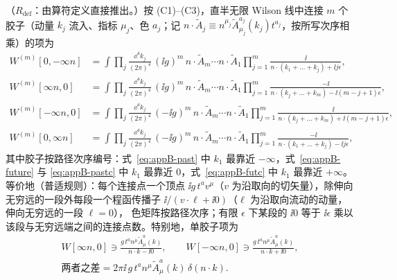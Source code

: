 \begin{proposition}\label{prop:appB-rules}
（$R_{\mathrm{def}}$：由算符定义直接推出。）按 (C1)--(C3)，直半无限 Wilson 线中连接 $m$ 个胶子（动量 $k_j$ 流入、指标 $\mu_j$、色 $a_j$；记 $n\cdot\tilde A_j\equiv n^{\mu_j}\tilde A^{a_j}_{\mu_j}(k_j)t^{a_j}$，按所写次序相乘）的项为
\begin{align}
W^{(m)}[0,-\infty n]&=\int\!\prod_j\frac{\dd^4k_j}{(2\pi)^4}\,(\ii g)^m\,n\cdot\tilde A_m\cdots n\cdot\tilde A_1\prod_{j=1}^m\frac{\ii}{n\cdot(k_1+\dots+k_j)+\ii j\epsilon},\label{eq:appB-past}\\
W^{(m)}[\infty n,0]&=\int\!\prod_j\frac{\dd^4k_j}{(2\pi)^4}\,(\ii g)^m\,n\cdot\tilde A_m\cdots n\cdot\tilde A_1\prod_{j=1}^m\frac{-\ii}{n\cdot(k_j+\dots+k_m)-\ii(m-j+1)\epsilon},\label{eq:appB-future}\\
W^{(m)}[-\infty n,0]&=\int\!\prod_j\frac{\dd^4k_j}{(2\pi)^4}\,(-\ii g)^m\,n\cdot\tilde A_m\cdots n\cdot\tilde A_1\prod_{j=1}^m\frac{\ii}{n\cdot(k_j+\dots+k_m)+\ii(m-j+1)\epsilon},\label{eq:appB-pastc}\\
W^{(m)}[0,\infty n]&=\int\!\prod_j\frac{\dd^4k_j}{(2\pi)^4}\,(-\ii g)^m\,n\cdot\tilde A_m\cdots n\cdot\tilde A_1\prod_{j=1}^m\frac{-\ii}{n\cdot(k_1+\dots+k_j)-\ii j\epsilon},\label{eq:appB-futc}
\end{align}
其中胶子按路径次序编号：式~\eqref{eq:appB-past} 中 $k_1$ 最靠近 $-\infty$，式~\eqref{eq:appB-future} 与 \eqref{eq:appB-pastc} 中 $k_1$ 最靠近 $0$，式~\eqref{eq:appB-futc} 中 $k_1$ 最靠近 $+\infty$。
等价地（普适规则）：每个连接点一个顶点 $\ii g\,t^av^\mu$（$v$ 为沿取向的切矢量），除伸向无穷远的一段外每段一个程函传播子 $\ii/(v\cdot\ell+\ii0)$（$\ell$ 为沿取向流动的动量，伸向无穷远的一段 $\ell=0$），
色矩阵按路径次序；有限 $\epsilon$ 下某段的 $\ii0$ 等于 $\ii\epsilon$ 乘以该段与无穷远端之间的连接点数。特别地，单胶子项为
\begin{equation}\label{eq:appB-onegluon}
\begin{gathered}
W[\infty n,0]\ni\frac{g\,t^an^\mu\tilde A^a_\mu(k)}{n\cdot k-\ii0},\qquad W[-\infty n,0]\ni\frac{g\,t^an^\mu\tilde A^a_\mu(k)}{n\cdot k+\ii0},\\
\text{两者之差}=2\pi\ii\,g\,t^an^\mu\tilde A^a_\mu(k)\,\delta(n\cdot k).
\end{gathered}
\end{equation}
\end{proposition}

